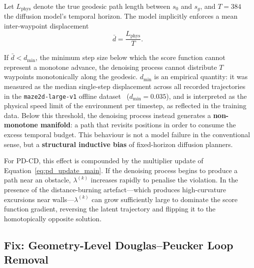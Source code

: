 \documentclass[12pt, a4paper, oneside]{report}
\theoremstyle{definition}
\begin{document}
Let $L_{\mathrm{phys}}$ denote the true geodesic path length
between $s_0$ and $s_g$, and $T = 384$ the diffusion model's
temporal horizon. The model implicitly enforces a mean
inter-waypoint displacement
\begin{equation}
  \bar{d} = \frac{L_{\mathrm{phys}}}{T}.
  \label{eq:mean_disp}
\end{equation}

If $\bar{d} < d_{\mathrm{min}}$, the minimum step size below which
the score function cannot represent a monotone advance, the
denoising process cannot distribute $T$ waypoints monotonically
along the geodesic. $d_{\mathrm{min}}$ is an empirical quantity:
it was measured as the median single-step displacement across all
recorded trajectories in the \texttt{maze2d-large-v1} offline
dataset~\citep{fu2020d4rl} ($d_{\mathrm{min}} = 0.035$), and is
interpreted as the physical speed limit of the environment per
timestep, as reflected in the training data. Below this threshold,
the denoising process instead generates a \textbf{non-monotone
manifold}: a path that revisits positions in order to consume the
excess temporal budget. This behaviour is not a model failure in
the conventional sense, but a \textbf{structural inductive bias} of
fixed-horizon diffusion planners.

For PD-CD, this effect is compounded by the multiplier update of
Equation~\eqref{eq:pd_update_main}. If the denoising process begins
to produce a path near an obstacle, $\lambda^{(k)}$ increases
rapidly to penalise the violation. In the presence of the
distance-burning artefact---which produces high-curvature
excursions near walls---$\lambda^{(k)}$ can grow sufficiently large
to dominate the score function gradient, reversing the latent
trajectory and flipping it to the homotopically opposite solution.

\subsection{Fix: Geometry-Level Douglas--Peucker Loop Removal}
\label{sec:fm3_fix}
\end{document}
